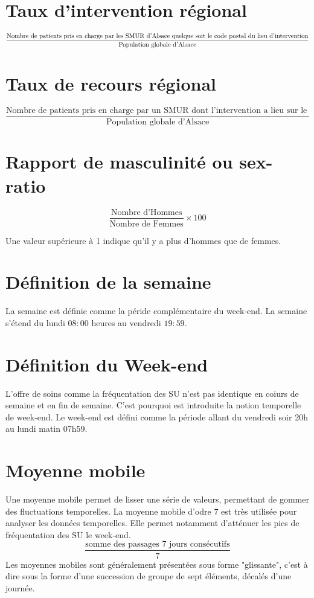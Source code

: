 \documentclass[12pt,english,french,twoside]{report}\usepackage[]{graphicx}\usepackage[]{color}
\begin{document}
\section*{Taux d'intervention régional}
\begin{displaymath}
    \frac{\text{Nombre de patients pris en charge par les SMUR d'Alsace}\linebreak[4] \text{ quelque soit le code postal du lieu d'intervention}}{\text{Population globale d'Alsace}}
  \end{displaymath}

\section*{Taux de recours régional}
\begin{displaymath}
    \frac{\text{Nombre de patients pris en charge par un SMUR dont l'intervention a lieu sur le territoire régional }}{\text{Population globale d'Alsace}}
  \end{displaymath}

\section*{Rapport de masculinité ou sex-ratio}
\begin{displaymath}
    \frac{\text{Nombre d'Hommes}}{\text{Nombre de Femmes}} \times 100
\end{displaymath}

Une valeur supérieure à 1 indique qu'il y a plus d'hommes que de femmes.

\section*{Définition de la semaine}
La semaine est définie comme la péride complémentaire du week-end. La semaine s'étend du lundi $08:00$ heures au vendredi $19:59$.

\section*{Définition du Week-end}
L'offre de soins comme la fréquentation des SU n'est pas identique en coiurs de semaine et en fin de semaine. C'est pourquoi est introduite la notion temporelle de week-end.
Le week-end est défini comme la période allant du vendredi soir 20h au lundi matin 07h59.

\section*{Moyenne mobile}
Une moyenne mobile permet de lisser une série de valeurs, permettant de gommer des fluctuations temporelles. La moyenne mobile d'odre $7$ est très utilisée pour analyser les données temporelles. Elle permet notamment d'atténuer les pics de fréquentation des SU le week-end.
\begin{displaymath}
    \frac{\text{somme des passages 7 jours consécutifs}}{7}
\end{displaymath}
Les moyennes mobiles sont généralement présentées sous forme "glissante", c'est à dire sous la forme d'une succession de groupe de sept éléments, décalés d'une journée.
\end{document}
